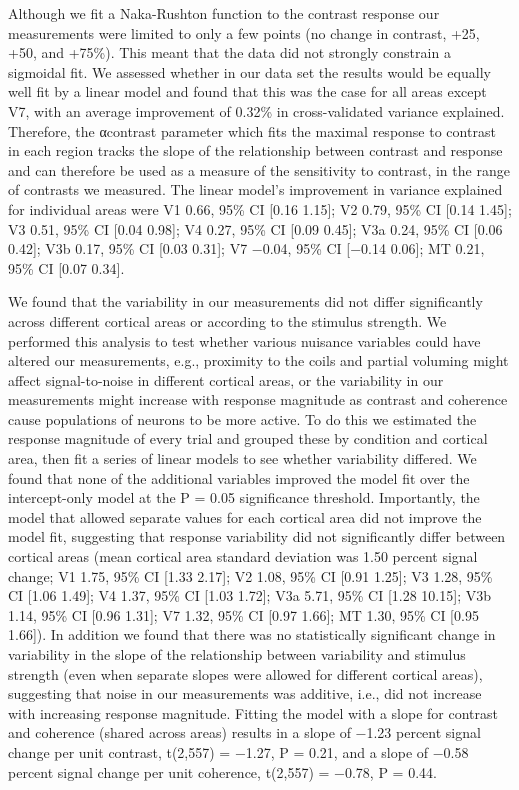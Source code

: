\documentclass{report}
\begin{document}
Although we fit a Naka-Rushton function to the contrast response our measurements were limited to only a few points (no change in contrast, +25, +50, and +75\%). This meant that the data did not strongly constrain a sigmoidal fit. We assessed whether in our data set the results would be equally well fit by a linear model and found that this was the case for all areas except V7, with an average improvement of 0.32\% in cross-validated variance explained. Therefore, the αcontrast parameter which fits the maximal response to contrast in each region tracks the slope of the relationship between contrast and response and can therefore be used as a measure of the sensitivity to contrast, in the range of contrasts we measured. The linear model’s improvement in variance explained for individual areas were V1 0.66, 95\% CI [0.16 1.15]; V2 0.79, 95\% CI [0.14 1.45]; V3 0.51, 95\% CI [0.04 0.98]; V4 0.27, 95\% CI [0.09 0.45]; V3a 0.24, 95\% CI [0.06 0.42]; V3b 0.17, 95\% CI [0.03 0.31]; V7 −0.04, 95\% CI [−0.14 0.06]; MT 0.21, 95\% CI [0.07 0.34].

We found that the variability in our measurements did not differ significantly across different cortical areas or according to the stimulus strength. We performed this analysis to test whether various nuisance variables could have altered our measurements, e.g., proximity to the coils and partial voluming might affect signal-to-noise in different cortical areas, or the variability in our measurements might increase with response magnitude as contrast and coherence cause populations of neurons to be more active. To do this we estimated the response magnitude of every trial and grouped these by condition and cortical area, then fit a series of linear models to see whether variability differed. We found that none of the additional variables improved the model fit over the intercept-only model at the P = 0.05 significance threshold. Importantly, the model that allowed separate values for each cortical area did not improve the model fit, suggesting that response variability did not significantly differ between cortical areas (mean cortical area standard deviation was 1.50 percent signal change; V1 1.75, 95\% CI [1.33 2.17]; V2 1.08, 95\% CI [0.91 1.25]; V3 1.28, 95\% CI [1.06 1.49]; V4 1.37, 95\% CI [1.03 1.72]; V3a 5.71, 95\% CI [1.28 10.15]; V3b 1.14, 95\% CI [0.96 1.31]; V7 1.32, 95\% CI [0.97 1.66]; MT 1.30, 95\% CI [0.95 1.66]). In addition we found that there was no statistically significant change in variability in the slope of the relationship between variability and stimulus strength (even when separate slopes were allowed for different cortical areas), suggesting that noise in our measurements was additive, i.e., did not increase with increasing response magnitude. Fitting the model with a slope for contrast and coherence (shared across areas) results in a slope of −1.23 percent signal change per unit contrast, t(2,557) = −1.27, P = 0.21, and a slope of −0.58 percent signal change per unit coherence, t(2,557) = −0.78, P = 0.44.
\end{document}
